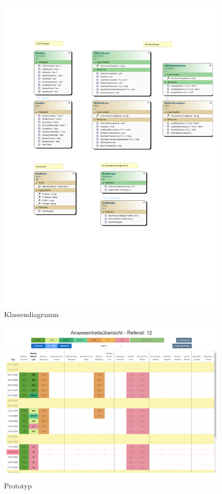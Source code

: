 \begin{figure}[htb]
    \centering
    \includegraphics[width=1\textwidth,angle=0]{anhang/abb/Klassendiagramm.pdf}
    \caption[Beschreibung]{Klassendiagramm}
    \label{abb:Klassendiagramm}
\end{figure}

\begin{figure}[htb]
    \centering
    \includegraphics[angle=90, page=1,height=0.90\textheight, keepaspectratio]{abb/Prototyp_GUI.png}
    \caption[Beschreibung]{Prototyp}
    \label{abb:Prototyp}
\end{figure}